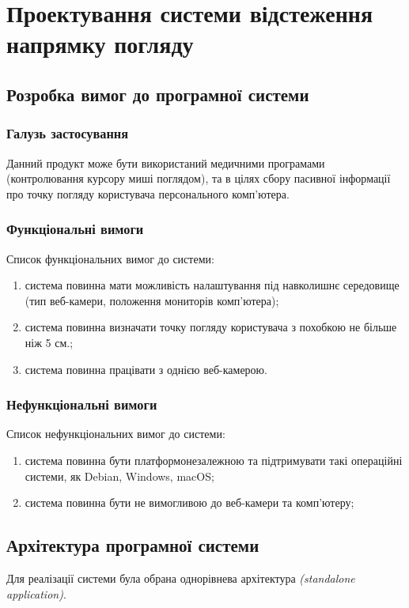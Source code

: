 \section{Проектування системи відстеження напрямку погляду}
\subsection{Розробка вимог до програмної системи}
\subsubsection{Галузь застосування}
Данний продукт може бути використаний медичними програмами (контролювання курсору миші поглядом), та в цілях сбору пасивної інформації про точку погляду користувача персонального комп'ютера.

\subsubsection{Функціональні вимоги}
Список функціональних вимог до системи:
\begin{enumerate}[label={\arabic*)}]
	\item система повинна мати можливість налаштування під навколишнє середовище (тип веб-камери, положення мониторів комп'ютера);
	\item система повинна визначати точку погляду користувача з похобкою не більше ніж 5 см.;
	\item система повинна працівати з однією веб-камерою.  
\end{enumerate}

\subsubsection{Нефункціональні вимоги}
Список нефункціональних вимог до системи:
\begin{enumerate}[label={\arabic*)}]
	\item система повинна бути платформонезалежною та підтримувати такі операційні системи, як Debian, Windows, macOS;
	\item система повинна бути не вимогливою до веб-камери та комп'ютеру;
\end{enumerate}

\subsection{Архітектура програмної системи}
Для реалізації системи була обрана однорівнева архітектура \textit{(standalone application)}.

